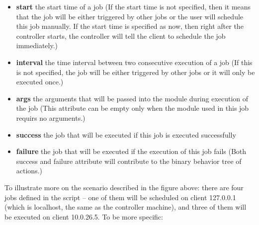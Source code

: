 \documentclass[12pt]{report}
\begin{document}
\begin{itemize}
\item \textbf{start} the start time of a job (If the start time is not specified, then it means that the job will be either triggered by other jobs or the user will schedule this job manually. If the start time is specified as now, then right after the controller starts, the controller will tell the client to schedule the job immediately.)
\item \textbf{interval} the time interval between two consecutive execution of a job (If this is not specified, the job will be either triggered by other jobs or it will only be executed once.)
\item \textbf{args} the arguments that will be passed into the module during execution of the job (This attribute can be empty only when the module used in this job requirs no arguments.)
\item \textbf{success} the job that will be executed if this job is executed successfully
\item \textbf{failure} the job that will be executed if the execution of this job fails (Both success and failure attribute will contribute to the binary behavior tree of actions.)
\end{itemize}

To illustrate more on the scenario described in the figure above: there are four jobs defined in the script -- one of them will be scheduled on client 127.0.0.1 (which is localhost, the same as the controller machine), and three of them will be executed on client 10.0.26.5. To be more specific:
\end{document}
